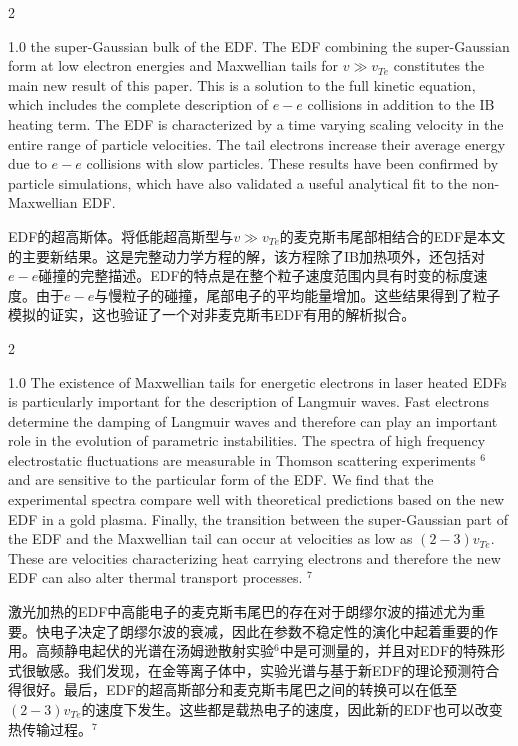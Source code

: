 \documentclass[oneside,onecolumn]{article}
\newcommand\enzhbox[2]{
	\quad\par \begin{paracol}{2} 
			\begin{spacing}{1.0}
					\footnotesize  #1
			\end{spacing}
			
		\switchcolumn[1] 
		#2
	\end{paracol} 
}
\begin{document}
\begin{sloppypar}
\enzhbox{   the super-Gaussian bulk of the EDF. The EDF combining the super-Gaussian form at low electron energies and Maxwellian tails for $v \gg v_{T e}$ constitutes the main new result of this paper. This is a solution to the full kinetic equation, which includes the complete description of $e-e$ collisions in addition to the IB heating term. The EDF is characterized by a time varying scaling velocity in the entire range of particle velocities. The tail electrons increase their average energy due to $e-e$ collisions with slow particles. These results have been confirmed by particle simulations, which have also validated a useful analytical fit to the non-Maxwellian EDF.
}{
 EDF的超高斯体。将低能超高斯型与$v \gg v_{T e}$的麦克斯韦尾部相结合的EDF是本文的主要新结果。这是完整动力学方程的解，该方程除了IB加热项外，还包括对$e-e$碰撞的完整描述。EDF的特点是在整个粒子速度范围内具有时变的标度速度。由于$e-e$与慢粒子的碰撞，尾部电子的平均能量增加。这些结果得到了粒子模拟的证实，这也验证了一个对非麦克斯韦EDF有用的解析拟合。
}
  

\enzhbox{  The existence of Maxwellian tails for energetic electrons in laser heated EDFs is particularly important for the description of Langmuir waves. Fast electrons determine the damping of Langmuir waves and therefore can play an important role in the evolution of parametric instabilities. The spectra of high frequency electrostatic fluctuations are measurable in Thomson scattering experiments ${ }^{6}$ and are sensitive to the particular form of the EDF. We find that the experimental spectra compare well with theoretical predictions based on the new EDF in a gold plasma. Finally, the transition between the super-Gaussian part of the EDF and the Maxwellian tail can occur at velocities as low as $(2-3) v_{T e}$. These are velocities characterizing heat carrying electrons and therefore the new EDF can also alter thermal transport processes. ${ }^{7}$
}{
激光加热的EDF中高能电子的麦克斯韦尾巴的存在对于朗缪尔波的描述尤为重要。快电子决定了朗缪尔波的衰减，因此在参数不稳定性的演化中起着重要的作用。高频静电起伏的光谱在汤姆逊散射实验${ }^{6}$中是可测量的，并且对EDF的特殊形式很敏感。我们发现，在金等离子体中，实验光谱与基于新EDF的理论预测符合得很好。最后，EDF的超高斯部分和麦克斯韦尾巴之间的转换可以在低至$(2-3) v_{T e}$的速度下发生。这些都是载热电子的速度，因此新的EDF也可以改变热传输过程。${ }^{7}$
}
  


\end{sloppypar}
\end{document}
